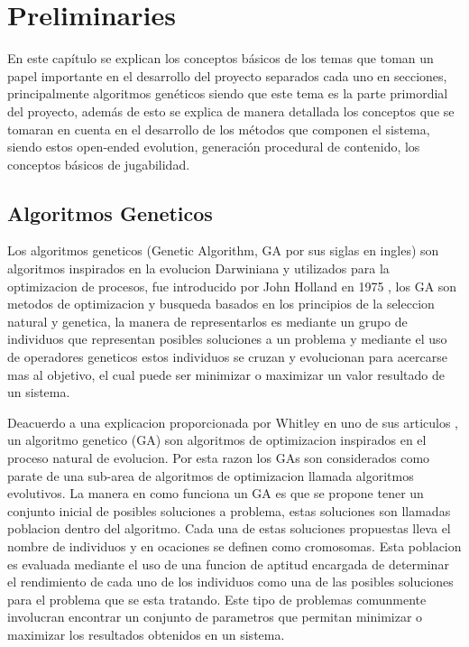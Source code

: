 \chapter{Preliminaries}
\label{chapter:preliminaries}

En este capítulo se explican los conceptos básicos de los temas que toman un
papel importante en el desarrollo del proyecto separados cada uno en secciones,
principalmente algoritmos genéticos siendo que este tema es la parte primordial
del proyecto, además de esto se explica de manera detallada los conceptos que se
tomaran en cuenta en el desarrollo de los métodos que componen el sistema,
siendo estos open-ended evolution, generación procedural de contenido, los
conceptos básicos de jugabilidad.

\section{Algoritmos Geneticos}
\label{section:genetic-algorithms}

Los algoritmos geneticos (Genetic Algorithm, GA por sus siglas en ingles) son
algoritmos inspirados en la evolucion Darwiniana y utilizados para la
optimizacion de procesos, fue introducido por John Holland en 1975
\cite{Holland1975}, los GA son metodos de optimizacion y busqueda basados en los
principios de la seleccion natural y genetica, la manera de representarlos es
mediante un grupo de individuos que representan posibles soluciones a un
problema y mediante el uso de operadores geneticos estos individuos se cruzan y
evolucionan para acercarse mas al objetivo, el cual puede ser minimizar o
maximizar un valor resultado de un sistema.

Deacuerdo a una explicacion proporcionada por Whitley en uno de sus articulos
\cite{Whitley1994}, un algoritmo genetico (GA) son algoritmos de optimizacion
inspirados en el proceso natural de evolucion. Por esta razon los GAs son
considerados como parate de una sub-area de algoritmos de optimizacion llamada
algoritmos evolutivos. La manera en como funciona un GA es que se propone tener
un conjunto inicial de posibles soluciones a problema, estas soluciones son
llamadas poblacion dentro del algoritmo. Cada una de estas soluciones propuestas
lleva el nombre de individuos y en ocaciones se definen como cromosomas. Esta
poblacion es evaluada mediante el uso de una funcion de aptitud encargada de
determinar el rendimiento de cada uno de los individuos como una de las posibles
soluciones para el problema que se esta tratando. Este tipo de problemas
comunmente involucran encontrar un conjunto de parametros que permitan minimizar
o maximizar los resultados obtenidos en un sistema.


